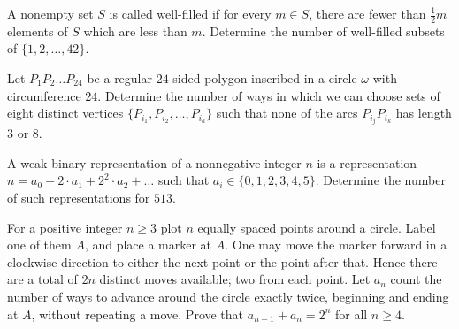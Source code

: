 \documentclass[11pt][mast]{lucky}
\begin{document}
\begin{prob}[HMMT 2016 T6]{9}
A nonempty set $S$ is called well-filled if for every $m \in S$, there are fewer than $\frac{1}{2} m$ elements of $S$ which are less than $m$. Determine the number of well-filled subsets of $\{1,2, \ldots, 42\}$.
\end{prob}

\begin{prob}{9}
Let $P_1P_2\ldots P_{24}$ be
a regular $24$-sided polygon inscribed in a circle $\omega$ with circumference 
$24.$ Determine the number of ways in which we can choose sets of
eight distinct vertices $\{P_{i_1} , P_{i_2}
,\ldots , P_{i_a }\}$ such that none of the arcs
$P_{i_j}P_{i_k}$ has length $3$ or $8.$ 
\end{prob}

\begin{prob}[PUMaC 2019 A/6]{13}

A weak binary representation of a nonnegative integer $n$ is a representation $n=a_0+2\cdot a_1+2^2\cdot a_2+\dots$ such that $a_i\in\{0,1,2,3,4,5\}$. Determine the number of such representations for $513$.
\end{prob}


\begin{prob}[USAMO 2013/2]{13}
For a positive integer $n\geq 3$ plot $n$ equally spaced points around a circle.  Label one of them $A$, and place a marker at $A$.  One may move the marker forward in a clockwise direction to either the next point or the point after that.  Hence there are a total of $2n$ distinct moves available; two from each point.  Let $a_n$ count the number of ways to advance around the circle exactly twice, beginning and ending at $A$, without repeating a move.  Prove that $a_{n-1}+a_n=2^n$ for all $n\geq 4$.
\end{prob}

%
%        
%        
\end{document}
